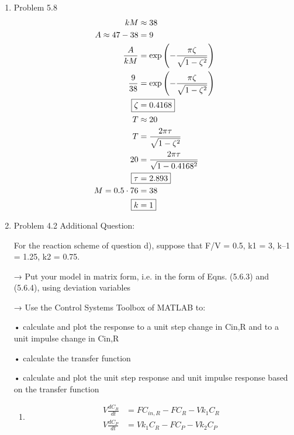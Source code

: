 \documentclass[12pt]{article}
\begin{document}
\begin{enumerate}
\newpage
\item Problem 5.8
\begin{align*}
    kM &\approx 38 \\
    A \approx 47 - 38 &= 9 \\
    \frac{A}{kM} &= \exp{\left(-\frac{\pi\zeta}{\sqrt{1 - \zeta^2}}\right)} \\
    \frac{9}{38} &= \exp{\left(-\frac{\pi\zeta}{\sqrt{1 - \zeta^2}}\right)} \\
    \Aboxed{\zeta &= 0.4168} \\
    T &\approx 20 \\
    T &= \frac{2\pi\tau}{\sqrt{1 - \zeta^2}} \\
    20 &= \frac{2\pi\tau}{\sqrt{1 - 0.4168^2}} \\
    \Aboxed{\tau &= 2.893} \\
    M = 0.5 \cdot 76 &= 38 \\
    \Aboxed{k &= 1}
\end{align*}

\newpage
\item Problem 4.2
Additional Question:

For the reaction scheme of question d), suppose that F/V = 0.5, k1 = 3, k–1 = 1.25, k2 = 0.75.

→ Put your model in matrix form, i.e. in the form of Eqns. (5.6.3) and (5.6.4), using deviation variables

→ Use the Control Systems Toolbox of MATLAB to:

• calculate and plot the response to a unit step change in Cin,R and to a unit impulse change in Cin,R

• calculate the transfer function

• calculate and plot the unit step response and unit impulse response based on the transfer function

\begin{enumerate}
    \item 
    \begin{align*}
        V \frac{dC_R}{dt} &= F C_{in,R} - F C_R - V k_1 C_R \\
        V \frac{dC_P}{dt} &= V k_1 C_R - F C_P - V k_2 C_P
    \end{align*}
    

\end{enumerate}
\end{enumerate}
\end{document}
